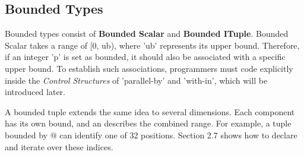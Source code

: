 \subsection*{Bounded Types}

Bounded types consist of \textbf{Bounded Scalar} and \textbf{Bounded ITuple}. Bounded Scalar takes a range of [0, ub), where 'ub' represents its upper bound. Therefore, if an integer 'p' is set as bounded, it should also be associated with a specific upper bound. To establish such associations, programmers must code explicitly inside the \emph{Control Structures} of 'parallel-by' and 'with-in', which will be introduced later.

A bounded tuple extends the same idea to several dimensions. Each component has its own bound, and an \co@mdspan@ describes the combined range. For example, a tuple bounded by \co@[4, 8]@ can identify one of 32 positions. Section 2.7 shows how to declare and iterate over these indices.

